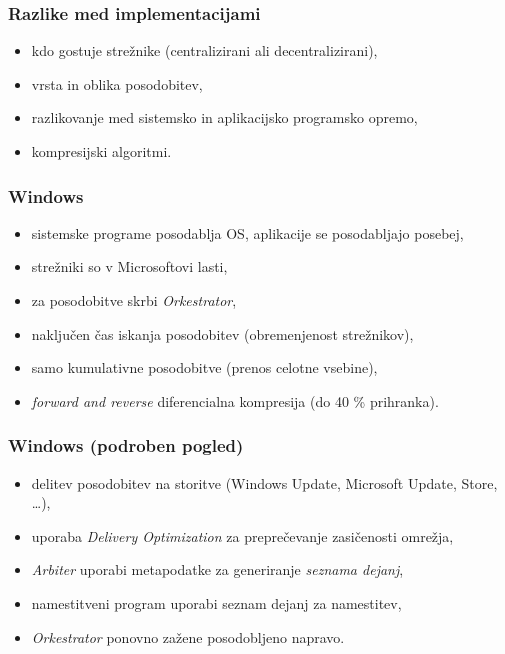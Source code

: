 \documentclass[aspectratio=169]{beamer}
\begin{document}
    \begin{frame}
        \frametitle{Razlike med implementacijami}
        \begin{itemize}
            \item kdo gostuje strežnike (centralizirani ali decentralizirani),
            \item vrsta in oblika posodobitev,
            \item razlikovanje med sistemsko in aplikacijsko programsko opremo,
            \item kompresijski algoritmi.
        \end{itemize}
    \end{frame}

    \begin{frame}
        \frametitle{Windows}
        \begin{itemize}
            \item sistemske programe posodablja OS, aplikacije se posodabljajo posebej,
            \item strežniki so v Microsoftovi lasti,
            \item za posodobitve skrbi \emph{Orkestrator},
            \item naključen čas iskanja posodobitev (obremenjenost strežnikov),
            \item samo kumulativne posodobitve (prenos celotne vsebine),
            \item \emph{forward and reverse} diferencialna kompresija (do 40 \% prihranka).
        \end{itemize}
    \end{frame}

    \begin{frame}
        \frametitle{Windows (podroben pogled)}
        \begin{itemize}
            \item delitev posodobitev na storitve (Windows Update, Microsoft Update, Store, \ldots),
            \item uporaba \emph{Delivery Optimization} za preprečevanje zasičenosti omrežja,
            \item \emph{Arbiter} uporabi metapodatke za generiranje \emph{seznama dejanj},
            \item namestitveni program uporabi seznam dejanj za namestitev,
            \item \emph{Orkestrator} ponovno zažene posodobljeno napravo.
        \end{itemize}
    \end{frame}
\end{document}
